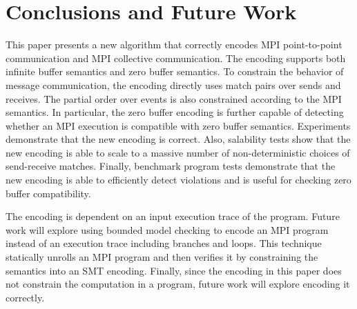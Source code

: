 \section{Conclusions and Future Work}
This paper presents a new algorithm that correctly encodes MPI point-to-point communication and MPI collective communication. The encoding supports both infinite buffer semantics and zero buffer semantics. To constrain the behavior of message communication, the encoding directly uses match pairs over sends and receives. The partial order over events is also constrained according to the MPI semantics. In particular, the zero buffer encoding is further capable of detecting whether an MPI execution is compatible with zero buffer semantics. Experiments demonstrate that the new encoding is correct. Also, salability tests show that the new encoding is able to scale to a massive number of non-deterministic choices of send-receive matches. Finally, benchmark program tests demonstrate that the new encoding is able to efficiently detect violations and is useful for checking zero buffer compatibility. 

The encoding is dependent on an input execution trace of the program. Future work will explore using bounded model checking to encode an MPI program instead of an execution trace including branches and loops. This technique statically unrolls an MPI program and then verifies it by constraining the semantics into an SMT encoding. Finally, since the encoding in this paper does not constrain the computation in a program, future work will explore encoding it correctly. 